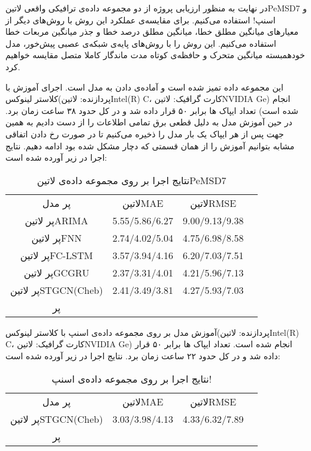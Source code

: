 
در نهایت به منظور ارزیابی پروژه از دو مجموعه داده‌ی ترافیکی واقعی ‌لاتین{PeMSD7} و اسنپ! استفاده می‌کنیم.
برای مقایسه‌ی عملکرد این روش با روش‌های دیگر از معیارهای میانگین مطلق خطا، میانگین مطلق درصد خطا و جذر میانگین مربعات خطا استفاده می‌کنیم.
این روش را با روش‌های پایه‌ی شبکه‌ی عصبی پیش‌خور، مدل خودهمبسته میانگین متحرک و حافظه‌ی کوتاه مدت ماندگار کاملا متصل  مقایسه خواهیم کرد.


این مجموعه داده تمیز شده است و آماده‌ی دادن به مدل است. اجرای آموزش با کلاستر لینوکس(پردازنده: ‌لاتین{Intel(R) C}، کارت گرافیک: ‌لاتین{NVIDIA Ge}) انجام شده است)
تعداد ایپاک ها برابر ۵۰ قرار داده شد و در کل حدود ۳۸ ساعت زمان برد.
در حین آموزش مدل به دلیل قطعی برق تمامی اطلاعات را از دست دادیم به همین جهت پس از هر ایپاک یک بار مدل را ذخیره می‌کنیم تا در صورت رخ دادن اتفاقی مشابه بتوانیم آموزش را از همان قسمتی که دچار مشکل شده بود ادامه دهیم. نتایج اجرا در زیر آورده شده است:

\begin{table}[h]
  \centering
  \caption{نتایج اجرا بر روی مجموعه داده‌ی ‌لاتین{PeMSD7}}
  \begin{tabular}{|c|c|c|c|}
    ‌پر
    مدل & ‌لاتین{MAE} & ‌لاتین{RMSE} \\
    ‌پر
    ‌لاتین{ARIMA} & 5.55/5.86/6.27 & 9.00/9.13/9.38 \\
    ‌پر
    ‌لاتین{FNN} & 2.74/4.02/5.04 & 4.75/6.98/8.58 \\
    ‌پر
    ‌لاتین{FC-LSTM} & 3.57/3.94/4.16 & 6.20/7.03/7.51 \\
    ‌پر
    ‌لاتین{GCGRU} & 2.37/3.31/4.01 & 4.21/5.96/7.13 \\
    ‌پر
    ‌لاتین{STGCN(Cheb)} & 2.41/3.49/3.81 & 4.27/5.93/7.03 \\
    ‌پر
  \end{tabular}
\end{table}


آموزش مدل بر روی مجموعه داده‌ی اسنپ با کلاستر لینوکس(پردازنده: ‌لاتین{Intel(R) C}، کارت گرافیک: ‌لاتین{NVIDIA Ge}) انجام شده است. تعداد ایپاک ها برابر ۵۰ قرار داده شد و در کل حدود ۲۲ ساعت زمان برد. نتایج اجرا در زیر آورده شده است:

\begin{table}[h]
  \centering
  \caption{نتایج اجرا بر روی مجموعه داده‌ی اسنپ!}
  \begin{tabular}{|c|c|c|c|}
    ‌پر
    مدل & ‌لاتین{MAE} & ‌لاتین{RMSE} \\
    ‌پر
    ‌لاتین{STGCN(Cheb)} & 3.03/3.98/4.13 & 4.33/6.32/7.89 \\
    ‌پر
  \end{tabular}
\end{table}

